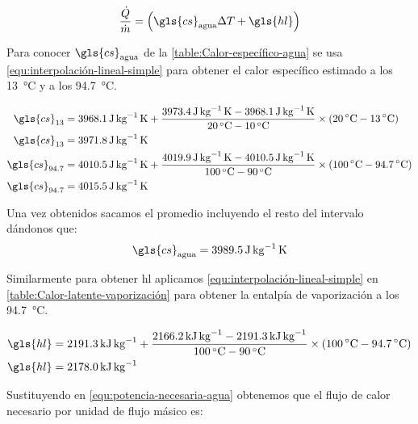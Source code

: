 		\begin{equation}\label{equ:potencia-necesaria-agua}
			\dfrac{\dot{Q}}{\dot{m}} = \left(\gls{cs}_{\text{agua}} \Delta T + \gls{hl}\right)
		\end{equation}
		
		Para conocer $\gls{cs}_{\text{agua}}$ de la \cref{table:Calor-específico-agua} se usa \eqref{equ:interpolación-lineal-simple} para obtener el calor específico estimado a los \qty{13}{\degreeCelsius} y a los \qty{94.7}{\degreeCelsius}.
		
		\begin{align*}
			\gls{cs}_{13} &= \qty{3968.1}{\joule\per\kg\kelvin} + \dfrac{\qty{3973.4}{\joule\per\kg\kelvin} - \qty{3968.1}{\joule\per\kg\kelvin}}{\qty{20}{\degreeCelsius}-\qty{10}{\degreeCelsius}} \times (\qty{20}{\degreeCelsius} - \qty{13}{\degreeCelsius})\\
			\gls{cs}_{13} &= \qty{3971.8}{\joule\per\kg\kelvin}\\
			\gls{cs}_{94.7} &= \qty{4010.5}{\joule\per\kg\kelvin} + \dfrac{\qty{4019.9}{\joule\per\kg\kelvin} - \qty{4010.5}{\joule\per\kg\kelvin}}{\qty{100}{\degreeCelsius}-\qty{90}{\degreeCelsius}} \times (\qty{100}{\degreeCelsius} - \qty{94.7}{\degreeCelsius})\\
			\gls{cs}_{94.7} &= \qty{4015.5}{\joule\per\kg\kelvin}
		\end{align*}
		
		Una vez obtenidos sacamos el promedio incluyendo el resto del intervalo dándonos que:
		\begin{equation*}
			\gls{cs}_{\text{agua}} = \qty{3989.5}{\joule\per\kg\kelvin}
		\end{equation*}
		
		Similarmente para obtener \gls{hl} aplicamos \eqref{equ:interpolación-lineal-simple} en \cref{table:Calor-latente-vaporización} para obtener la entalpía de vaporización a los \qty{94.7}{\degreeCelsius}.
		
		\begin{align*}
			\gls{hl} &= \qty{2191.3}{\kilo\joule\per\kg} + \dfrac{\qty{2166.2}{\kilo\joule\per\kg} - \qty{2191.3}{\kilo\joule\per\kg}}{\qty{100}{\degreeCelsius}-\qty{90}{\degreeCelsius}} \times (\qty{100}{\degreeCelsius} - \qty{94.7}{\degreeCelsius})\\
			\gls{hl} &= \qty{2178.0}{\kilo\joule\per\kg}
		\end{align*}
		
		Sustituyendo en \eqref{equ:potencia-necesaria-agua} obtenemos que el flujo de calor necesario por unidad de flujo másico es:
		
